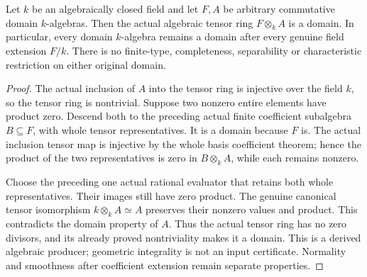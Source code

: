 \begin{theorem}
\label{algebra:geometric-domain-base-change}
\leanok
{}
Let $k$ be an algebraically closed field and let $F,A$ be arbitrary
commutative domain $k$-algebras. Then the actual algebraic tensor ring
$F\otimes_k A$ is a domain. In particular, every domain $k$-algebra
remains a domain after every genuine field extension $F/k$.
There is no finite-type, completeness, separability or characteristic
restriction on either original domain.
\end{theorem}
\begin{proof}
The actual inclusion of $A$ into the tensor ring is injective over the
field $k$, so the tensor ring is nontrivial. Suppose two nonzero entire
elements have product zero. Descend both to the preceding actual finite
coefficient subalgebra $B\subseteq F$, with whole tensor representatives.
It is a domain because $F$ is. The actual inclusion tensor map is injective
by the whole basis coefficient theorem; hence the product of the two
representatives is zero in $B\otimes_k A$, while each remains nonzero.

Choose the preceding one actual rational evaluator that retains both
whole representatives. Their images still have zero product. The genuine
canonical tensor isomorphism $k\otimes_k A\simeq A$ preserves their
nonzero values and product. This contradicts the domain property of $A$.
Thus the actual tensor ring has no zero divisors, and its already proved
nontriviality makes it a domain. This is a derived algebraic producer;
geometric integrality is not an input certificate. Normality and
smoothness after coefficient extension remain separate properties.
\end{proof}
